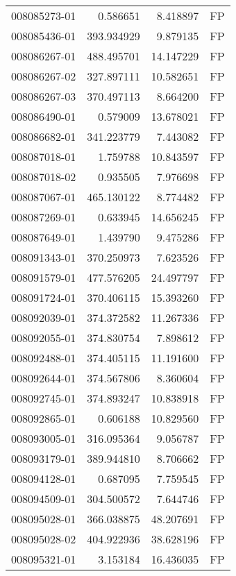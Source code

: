 \begin{tabular}{lrrl}
008085273-01 &    0.586651 &       8.418897 &   FP \\
008085436-01 &  393.934929 &       9.879135 &   FP \\
008086267-01 &  488.495701 &      14.147229 &   FP \\
008086267-02 &  327.897111 &      10.582651 &   FP \\
008086267-03 &  370.497113 &       8.664200 &   FP \\
008086490-01 &    0.579009 &      13.678021 &   FP \\
008086682-01 &  341.223779 &       7.443082 &   FP \\
008087018-01 &    1.759788 &      10.843597 &   FP \\
008087018-02 &    0.935505 &       7.976698 &   FP \\
008087067-01 &  465.130122 &       8.774482 &   FP \\
008087269-01 &    0.633945 &      14.656245 &   FP \\
008087649-01 &    1.439790 &       9.475286 &   FP \\
008091343-01 &  370.250973 &       7.623526 &   FP \\
008091579-01 &  477.576205 &      24.497797 &   FP \\
008091724-01 &  370.406115 &      15.393260 &   FP \\
008092039-01 &  374.372582 &      11.267336 &   FP \\
008092055-01 &  374.830754 &       7.898612 &   FP \\
008092488-01 &  374.405115 &      11.191600 &   FP \\
008092644-01 &  374.567806 &       8.360604 &   FP \\
008092745-01 &  374.893247 &      10.838918 &   FP \\
008092865-01 &    0.606188 &      10.829560 &   FP \\
008093005-01 &  316.095364 &       9.056787 &   FP \\
008093179-01 &  389.944810 &       8.706662 &   FP \\
008094128-01 &    0.687095 &       7.759545 &   FP \\
008094509-01 &  304.500572 &       7.644746 &   FP \\
008095028-01 &  366.038875 &      48.207691 &   FP \\
008095028-02 &  404.922936 &      38.628196 &   FP \\
008095321-01 &    3.153184 &      16.436035 &   FP \\

\end{tabular}
